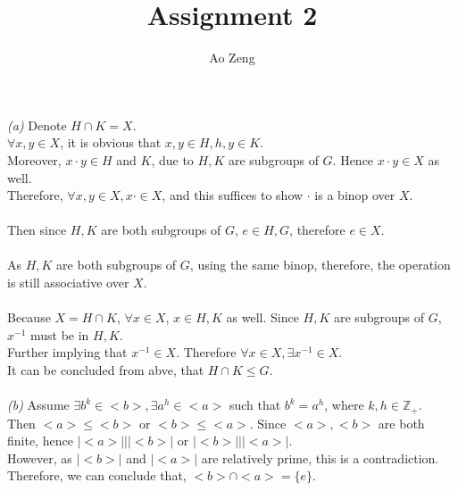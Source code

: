 \documentclass[11pt]{article}
\newcommand{\abs}[1]{\lvert #1 \rvert}
\newenvironment{problem}[2][Problem]{\begin{trivlist}
\item[\hskip \labelsep {\bfseries #1}\hskip \labelsep {\bfseries #2.}]}{\end{trivlist}}
\begin{document}
\title{Assignment 2}
\author{Ao Zeng}
\maketitle
\begin{problem}{(1)}
\textit{(a)} Denote $H \cap K = X$.\\
$\forall x,y \in X$, it is obvious that $x,y\in H, h,y\in K$.\\
Moreover, $x\cdot y \in H$ and $K$, due to $H,K$ are subgroups of $G$. Hence $x\cdot y \in X$ as well.\\
Therefore, $\forall x,y \in X, x\cdot \in X$, and this suffices to show $\cdot $ is a binop over $X$.\\
\\
Then since $H, K$ are both subgroups of $G$, $e \in H,G$, therefore $e \in X$.\\
\\
As $H, K$ are both subgroups of $G$, using the same binop, therefore, the operation is still associative
over $X$.\\
\\
Because $X = H \cap K$, $\forall x \in X$, $x \in H,K$ as well. Since $H,K$ are subgroups of $G$, $x^{-1}$ must be in $H, K$.\\
Further implying that $x^{-1} \in X$. Therefore $\forall x\in X, \exists x^{-1} \in X$.
\\
It can be concluded from abve, that $H\cap K \leq G$.\\
\\
\textit{(b)} Assume $\exists b^k \in <b>, \exists a^h \in <a>$ such that $ b^k = a^h$, where $k,h \in \mathbb{Z}_+$.\\
Then $<a> \leq <b>$ or $<b>\leq <a>$. Since $<a>, <b>$ are both finite, hence $\abs{<a>} | \abs{<b>}$ or $\abs{<b>} | \abs{<a>}$.\\
However, as $\abs{<b>}$ and $\abs{<a>}$ are relatively prime, this is a contradiction.\\
Therefore, we can conclude that, $<b> \cap <a> = \{ e \}$.
\end{problem}
\end{document}
